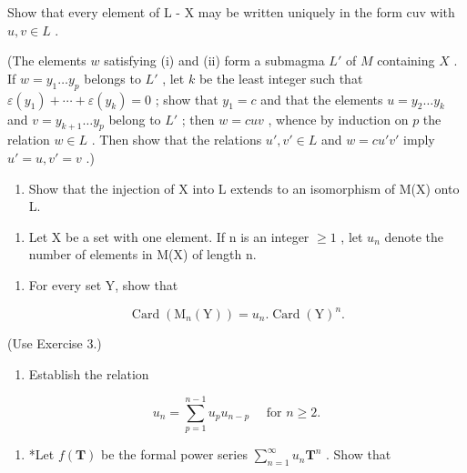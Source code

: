 Show that every element of L - X may be written uniquely in the form cuv with \(u, v \in L\) .

(The elements \(w\) satisfying (i) and (ii) form a submagma \(L'\) of \(M\) containing \(X\) . If \(w = y_1 \ldots y_p\) belongs to \(L'\) , let \(k\) be the least integer such that \(\varepsilon(y_1) + \cdots + \varepsilon(y_k) = 0\) ; show that \(y_1 = c\) and that the elements \(u = y_2 \ldots y_k\) and \(v = y_{k+1} \ldots y_p\) belong to \(L'\) ; then \(w = cuv\) , whence by induction on \(p\) the relation \(w \in L\) . Then show that the relations \(u', v' \in L\) and \(w = cu'v'\) imply \(u' = u, v' = v\) .)

\begin{enumerate}
\def\labelenumi{(\alph{enumi})}
\setcounter{enumi}{1}
\tightlist
\item
  Show that the injection of X into L extends to an isomorphism of M(X) onto L.
\end{enumerate}

\begin{enumerate}
\def\labelenumi{\arabic{enumi}.}
\setcounter{enumi}{4}
\tightlist
\item
  Let X be a set with one element. If n is an integer \(\geqslant1\) , let \(u_{n}\) denote the number of elements in M(X) of length n.
\end{enumerate}

\begin{enumerate}
\def\labelenumi{(\alph{enumi})}
\tightlist
\item
  For every set Y, show that
\end{enumerate}

\[
\operatorname{Card} \left(\mathrm{M} _ {n} (\mathrm{Y})\right) = u _ {n}. \operatorname{Card} (\mathrm{Y}) ^ {n}.
\]

(Use Exercise 3.)

\begin{enumerate}
\def\labelenumi{(\alph{enumi})}
\setcounter{enumi}{1}
\tightlist
\item
  Establish the relation
\end{enumerate}

\[
u _ {n} = \sum_ {p = 1} ^ {n - 1} u _ {p} u _ {n - p} \quad \text { for } n \geqslant 2.
\]

\begin{enumerate}
\def\labelenumi{(\alph{enumi})}
\setcounter{enumi}{2}
\tightlist
\item
  *Let \(f(\mathbf{T})\) be the formal power series \(\sum_{n=1}^{\infty} u_n \mathbf{T}^n\) . Show that
\end{enumerate}

